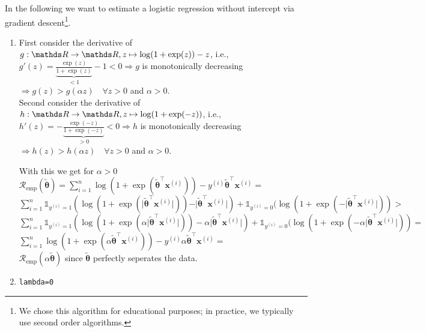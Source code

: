 \documentclass[a4paper]{article}
\makeatletter
\newcommand{\hlnum}[1]{\textcolor[rgb]{0.686,0.059,0.569}{#1}}%
\newcommand{\hlstd}[1]{\textcolor[rgb]{0.345,0.345,0.345}{#1}}%
\newcommand{\hlkwb}[1]{\textcolor[rgb]{0.69,0.353,0.396}{#1}}%
\newenvironment{kframe}{%
 \def\at@end@of@kframe{}%
 \ifinner\ifhmode%
  \def\at@end@of@kframe{\end{minipage}}%
  \begin{minipage}{\columnwidth}%
 \fi\fi%
 \def\FrameCommand##1{\hskip\@totalleftmargin \hskip-\fboxsep
 \colorbox{shadecolor}{##1}\hskip-\fboxsep
     \hskip-\linewidth \hskip-\@totalleftmargin \hskip\columnwidth}%
 \MakeFramed {\advance\hsize-\width
   \@totalleftmargin\z@ \linewidth\hsize
   \@setminipage}}%
 {\par\unskip\endMakeFramed%
 \at@end@of@kframe}
\newenvironment{knitrout}{}{} %
\makeatother
\begin{document}
{In the following we want to estimate a logistic regression without intercept via gradient descent\footnote{We chose this algorithm for educational purposes; in practice, we typically use second order algorithms.}.
\begin{enumerate}
\item  
First consider the derivative of $g:\R \rightarrow \R, z\mapsto \log(1+\exp(z)) - z$, i.e.,\\
$g'(z) = \underbrace{\frac{\exp(z)}{1+\exp(z)}}_{< 1} - 1 < 0 \Rightarrow g$ is monotonically decreasing $\Rightarrow g(z) > g(\alpha z) \quad \forall z > 0$ and $\alpha > 0.$
\\
Second consider the derivative of $h:\R \rightarrow \R, z\mapsto \log(1+\exp(-z))$, i.e.,\\
$h'(z) = -\underbrace{\frac{\exp(-z)}{1+\exp(-z)}}_{>0} < 0 \Rightarrow h$ is monotonically decreasing $\Rightarrow h(z) > h(\alpha z) \quad \forall z > 0$ and $\alpha > 0.$

With this we get for $\alpha > 0$ \\
$\mathcal{R}_\text{emp}(\tilde{\bm{\theta}}) = \sum^n_{i=1} \log(1 + \exp(\tilde{\bm{\theta}}^\top \mathbf{x}^{(i)})) - y^{(i)}\tilde{\bm{\theta}}^\top \mathbf{x}^{(i)} =$\\
$\sum^n_{i=1} \mathds{1}_{y^{(i)} = 1} (\log(1 + \exp(\vert\tilde{\bm{\theta}}^\top \mathbf{x}^{(i)}\vert)) - \vert\tilde{\bm{\theta}}^\top \mathbf{x}^{(i)}\vert) + \mathds{1}_{y^{(i)} = 0} (\log(1 + \exp(-\vert\tilde{\bm{\theta}}^\top \mathbf{x}^{(i)}\vert)) > $ \\
$\sum^n_{i=1} \mathds{1}_{y^{(i)} = 1} (\log(1 + \exp(\alpha\vert\tilde{\bm{\theta}}^\top \mathbf{x}^{(i)}\vert)) - \alpha\vert\tilde{\bm{\theta}}^\top \mathbf{x}^{(i)}\vert) + \mathds{1}_{y^{(i)} = 0} (\log(1 + \exp(-\alpha\vert\tilde{\bm{\theta}}^\top \mathbf{x}^{(i)}\vert)) = $ \\
$\sum^n_{i=1} \log(1 + \exp(\alpha\tilde{\bm{\theta}}^\top \mathbf{x}^{(i)})) - y^{(i)}\alpha\tilde{\bm{\theta}}^\top \mathbf{x}^{(i)} =$\\
$\mathcal{R}_\text{emp}(\alpha\tilde{\bm{\theta}})$ 
since $\tilde{\bm{\theta}}$ perfectly seperates the data.

\item
\begin{knitrout}
\color{fgcolor}\begin{kframe}
\begin{alltt}
\hlstd{lambda} \hlkwb{=} \hlnum{0}


\end{alltt}
\end{kframe}
\end{knitrout}
\end{enumerate}}
\end{document}

